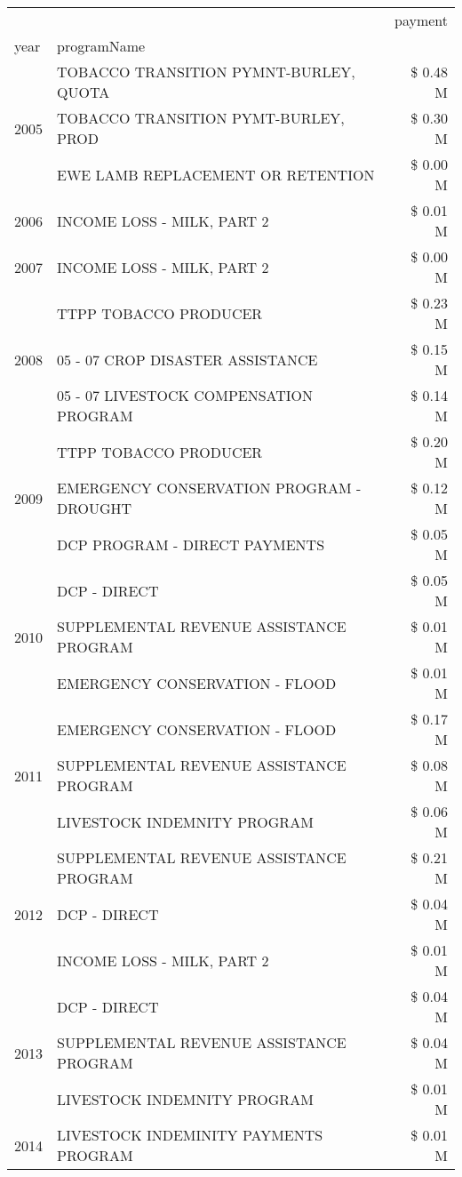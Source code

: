 \begin{tabular}{llr}
\toprule
 &  & payment \\
year & programName &  \\
\midrule
\multirow[t]{3}{*}{2005} & TOBACCO TRANSITION PYMNT-BURLEY, QUOTA & \$ 0.48 M \\
 & TOBACCO TRANSITION PYMT-BURLEY, PROD & \$ 0.30 M \\
 & EWE LAMB REPLACEMENT OR RETENTION & \$ 0.00 M \\
\cline{1-3}
2006 & INCOME LOSS - MILK, PART 2 & \$ 0.01 M \\
\cline{1-3}
2007 & INCOME LOSS - MILK, PART 2 & \$ 0.00 M \\
\cline{1-3}
\multirow[t]{3}{*}{2008} & TTPP TOBACCO PRODUCER & \$ 0.23 M \\
 & 05 - 07 CROP DISASTER ASSISTANCE & \$ 0.15 M \\
 & 05 - 07 LIVESTOCK COMPENSATION PROGRAM & \$ 0.14 M \\
\cline{1-3}
\multirow[t]{3}{*}{2009} & TTPP TOBACCO PRODUCER & \$ 0.20 M \\
 & EMERGENCY CONSERVATION PROGRAM - DROUGHT & \$ 0.12 M \\
 & DCP PROGRAM - DIRECT PAYMENTS & \$ 0.05 M \\
\cline{1-3}
\multirow[t]{3}{*}{2010} & DCP - DIRECT & \$ 0.05 M \\
 & SUPPLEMENTAL REVENUE ASSISTANCE PROGRAM & \$ 0.01 M \\
 & EMERGENCY CONSERVATION - FLOOD & \$ 0.01 M \\
\cline{1-3}
\multirow[t]{3}{*}{2011} & EMERGENCY CONSERVATION - FLOOD & \$ 0.17 M \\
 & SUPPLEMENTAL REVENUE ASSISTANCE PROGRAM & \$ 0.08 M \\
 & LIVESTOCK INDEMNITY PROGRAM & \$ 0.06 M \\
\cline{1-3}
\multirow[t]{3}{*}{2012} & SUPPLEMENTAL REVENUE ASSISTANCE PROGRAM & \$ 0.21 M \\
 & DCP - DIRECT & \$ 0.04 M \\
 & INCOME LOSS - MILK, PART 2 & \$ 0.01 M \\
\cline{1-3}
\multirow[t]{3}{*}{2013} & DCP - DIRECT & \$ 0.04 M \\
 & SUPPLEMENTAL REVENUE ASSISTANCE PROGRAM & \$ 0.04 M \\
 & LIVESTOCK INDEMNITY PROGRAM & \$ 0.01 M \\
\cline{1-3}
\multirow[t]{3}{*}{2014} & LIVESTOCK INDEMINITY PAYMENTS PROGRAM & \$ 0.01 M \\

\end{tabular}
